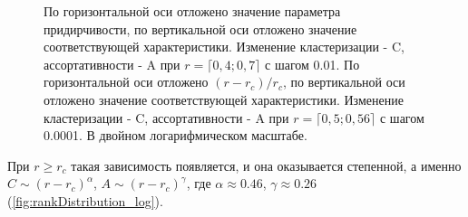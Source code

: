 \documentclass[10pt,aps,pra]{revtex4-1}
\begin{document}
            \begin{figure}[H]  
                \centering

                \caption{
                    \label{fig:baCharacteristic}
                     По горизонтальной оси отложено значение параметра придирчивости, по вертикальной оси отложено значение соответствующей характеристики. Изменение кластеризации - C, ассортативности - A при $r=\lceil 0,4; 0,7 \rceil$ с шагом 0.01. 
                     По горизонтальной оси отложено $(r-r_c)/r_c$, по вертикальной оси отложено значение соответствующей характеристики. Изменение кластеризации - C, ассортативности - A при $r=\lceil 0,5; 0,56 \rceil$ с шагом 0.0001. В двойном логарифмическом масштабе.
                }
            \end{figure}

        При $r \geq r_c$ такая зависимость появляется, и она оказывается степенной, а именно $C \sim {(r-r_c)}^\alpha$, $A \sim {(r-r_c)}^\gamma$, где $\alpha \approx 0.46$, $\gamma \approx 0.26$ (\ref{fig:rankDistribution_log}).
\end{document}
